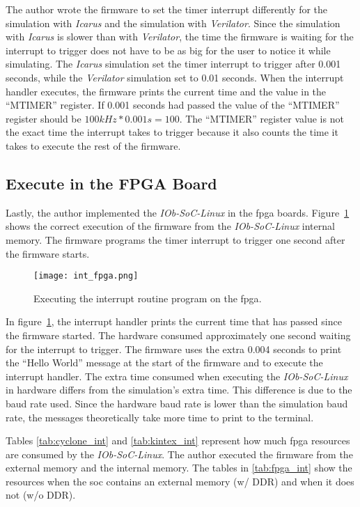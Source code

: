 The author wrote the firmware to set the timer interrupt differently for the simulation with \textit{Icarus} and the simulation with \textit{Verilator}. Since the simulation with \textit{Icarus} is slower than with \textit{Verilator}, the time the firmware is waiting for the interrupt to trigger does not have to be as big for the user to notice it while simulating. The \textit{Icarus} simulation set the timer interrupt to trigger after 0.001 seconds, while the \textit{Verilator} simulation set to 0.01 seconds. When the interrupt handler executes, the firmware prints the current time and the value in the \enquote{MTIMER} register. If 0.001 seconds had passed the value of the \enquote{MTIMER} register should be $100kHz*0.001s=100$. The \enquote{MTIMER} register value is not the exact time the interrupt takes to trigger because it also counts the time it takes to execute the rest of the firmware.

\subsection{Execute in the FPGA Board}
Lastly, the author implemented the \textit{IOb-SoC-Linux} in the \acrshort{fpga} boards. Figure~\ref{fig:int_fpga} shows the correct execution of the firmware from the \textit{IOb-SoC-Linux} internal memory. The firmware programs the timer interrupt to trigger one second after the firmware starts.

\begin{figure}[!ht]
    \centering
    \texttt{[image: int\_fpga.png]}
    \caption{Executing the interrupt routine program on the \acrshort{fpga}.}
    \label{fig:int_fpga}
\end{figure}

In figure~\ref{fig:int_fpga}, the interrupt handler prints the current time that has passed since the firmware started. The hardware consumed approximately one second waiting for the interrupt to trigger. The firmware uses the extra 0.004 seconds to print the \enquote{Hello World} message at the start of the firmware and to execute the interrupt handler. The extra time consumed when executing the \textit{IOb-SoC-Linux} in hardware differs from the simulation's extra time. This difference is due to the baud rate used. Since the hardware baud rate is lower than the simulation baud rate, the messages theoretically take more time to print to the terminal.

Tables \ref{tab:cyclone_int} and \ref{tab:kintex_int} represent how much \acrshort{fpga} resources are consumed by the \textit{IOb-SoC-Linux}. The author executed the firmware from the external memory and the internal memory. The tables in \ref{tab:fpga_int} show the resources when the \acrshort{soc} contains an external memory (w/ DDR) and when it does not (w/o DDR).

